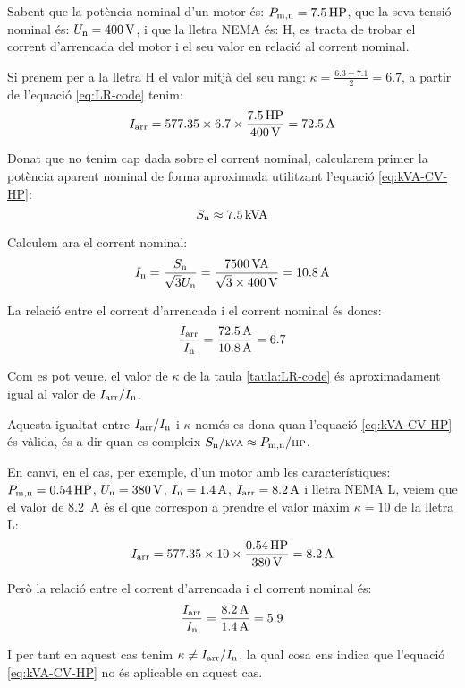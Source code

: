 \begin{exemple}
    Sabent que la  potència nominal d'un motor és: $P\ped{m,n} = \SI{7,5}{HP}$,    que la seva tensió nominal és: $U\ped{n}=\SI{400}{V}$, i que la lletra NEMA és: H, es tracta de trobar el corrent d'arrencada  del  motor i el seu valor en relació al corrent nominal.

    Si prenem per a la lletra H el valor mitjà del seu rang: $\kappa = \frac{\num{6,3}+\num{7,1}}{2}=\num{6,7}$, a partir de l'equació  \eqref{eq:LR-code} tenim:
    \[
      I\ped{arr} = \num{577,35} \times \num{6,7} \times \frac{\SI{7,5}{HP}}{\SI{400}{V}} = \SI{72,5}{A}
    \]

    Donat que no tenim cap dada sobre el corrent nominal, calcularem primer la potència aparent nominal de forma aproximada utilitzant l'equació \eqref{eq:kVA-CV-HP}:
    \[
        S\ped{n} \approx \SI{7,5}{kVA}
    \]

    Calculem ara el corrent nominal:
    \[
        I\ped{n}= \frac{S\ped{n}}{\sqrt{3} U\ped{n}} = \frac{\SI{7500}{VA}}{\sqrt{3}\times\SI{400}{V}} = \SI{10,8}{A}
    \]

    La relació entre el corrent d'arrencada i el corrent nominal és doncs:
    \[
        \frac{I\ped{arr}}{I\ped{n}} = \frac{\SI{72,5}{A}}{\SI{10,8}{A}} = \num{6,7}
    \]

    Com es pot veure, el valor  de $\kappa$ de la taula \vref{taula:LR-code} és aproximadament igual al valor de $I\ped{arr}/I\ped{n}$.

    Aquesta igualtat entre $I\ped{arr}/I\ped{n}$ i $\kappa$ només es dona quan l'equació \eqref{eq:kVA-CV-HP} és vàlida, és a dir quan es compleix $S\ped{n}/{\scriptstyle \si{kVA}} \approx  P\ped{m,n}/{\scriptstyle \si{HP}}$.

    En canvi, en el cas, per exemple, d'un motor amb les característiques: $P\ped{m,n} = \SI{0,54}{HP}$, $U\ped{n} = \SI{380}{V}$, $I\ped{n} = \SI{1,4}{A}$, $I\ped{arr} = \SI{8,2}{A}$ i lletra NEMA L, veiem que el valor de \SI{8,2}{A} és el que correspon a prendre  el valor màxim $\kappa = 10$ de la lletra L:
    \[
      I\ped{arr} = \num{577,35} \times 10 \times \frac{\SI{0,54}{HP}}{\SI{380}{V}} = \SI{8,2}{A}
    \]

    Però la relació entre el corrent d'arrencada i el corrent nominal és:
    \[
        \frac{I\ped{arr}}{I\ped{n}} = \frac{\SI{8,2}{A}}{\SI{1,4}{A}} = \num{5,9}
    \]

    I per tant  en aquest cas tenim $\kappa \neq I\ped{arr}/I\ped{n}$, la qual cosa ens indica que l'equació \eqref{eq:kVA-CV-HP} no és aplicable en aquest cas.
\end{exemple}

